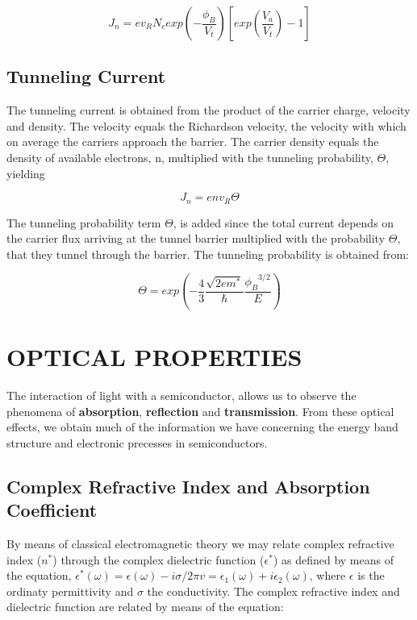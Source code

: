 \documentclass[%
reprint,
amsmath,amssymb,
aps,
]{revtex4-1}
\begin{document}
	\begin{equation}
		J_n = ev_R N_c exp({-\frac{\phi_B}{V_t}})[exp(\frac{V_a}{V_t}) - 1]
	\end{equation}
	
	\subsection*{Tunneling Current}
The tunneling current is obtained from the product of the carrier charge, velocity and density. The velocity equals the
Richardson velocity, the velocity with which on average the carriers approach the barrier. The carrier density equals the
density of available electrons, n, multiplied with the tunneling probability, $ \Theta $, yielding
	
	\begin{equation}
	J_n = e n v_R \Theta
	\end{equation}
	
The tunneling probability term $ \Theta $, is added since the total current depends on the carrier flux arriving at the tunnel barrier multiplied with the probability $ \Theta $, that they tunnel through the barrier.  The tunneling probability is obtained from:

\begin{equation}
\Theta = exp (-\frac{4}{3}\frac{\sqrt{2em^*}}{\hbar} \frac{{\phi_B}^{3/2} }{E})
\end{equation}
	
	
	
	
	
	\section{OPTICAL PROPERTIES}
	The interaction of light with a semiconductor, allows us to observe the phenomena of \textbf{absorption}, \textbf{reflection} and \textbf{transmission}. From these optical effects, we obtain much of the information we have concerning the energy band structure and electronic precesses in semiconductors. 
	
	
	
	
	\subsection{Complex Refractive Index and Absorption Coefficient}
	
	By means of classical electromagnetic theory we may relate  complex refractive index ($ n^*$) through the complex dielectric function ($ \epsilon^* $) as defined by means of the equation, $ \epsilon^*(\omega)  = \epsilon(\omega) - i\sigma/2\pi v = \epsilon_1(\omega) + i\epsilon_2(\omega) $, where $ \epsilon $ is the ordinaty permittivity and $ \sigma $ the conductivity. The complex refractive index and dielectric function are related by means of the equation:
	
\end{document}
